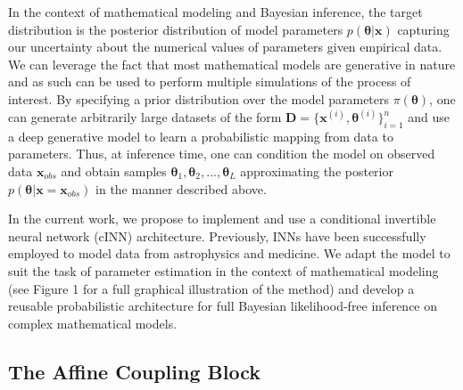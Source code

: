 \documentclass[9pt,twoside,lineno]{pnas-new}
\begin{document}
In the context of mathematical modeling and Bayesian inference, the target distribution is the posterior distribution of model parameters $p(\boldsymbol{\theta}|\boldsymbol{x})$ capturing our uncertainty about the numerical values of parameters given empirical data. We can leverage the fact that most mathematical models are generative in nature and as such can be used to perform multiple simulations of the process of interest. By specifying a prior distribution over the model parameters $\pi(\boldsymbol{\theta})$, one can generate arbitrarily large datasets of the form $\boldsymbol{D} = \{\boldsymbol{x}^{(i)}, \boldsymbol{\theta}^{(i)}\}_{i=1}^{n}$ and use a deep generative model to learn a probabilistic mapping from data to parameters. Thus, at inference time, one can condition the model on observed data $\boldsymbol{x}_{obs}$ and obtain samples $\boldsymbol{\theta}_{1}, \boldsymbol{\theta}_{2},...,\boldsymbol{\theta}_{L}$  approximating the posterior $p(\boldsymbol{\theta}|\boldsymbol{x}=\boldsymbol{x}_{obs})$ in the manner described above.

In the current work, we propose to implement and use a conditional invertible neural network (cINN) architecture. Previously, INNs have been successfully employed to model data from astrophysics and medicine\cite{ardizzone2018analyzing}. We adapt the model to suit the task of parameter estimation in the context of mathematical modeling (see Figure 1 for a full graphical illustration of the method) and develop a reusable probabilistic architecture for full Bayesian likelihood-free inference on complex mathematical models.

\subsection*{The Affine Coupling Block}
\end{document}
